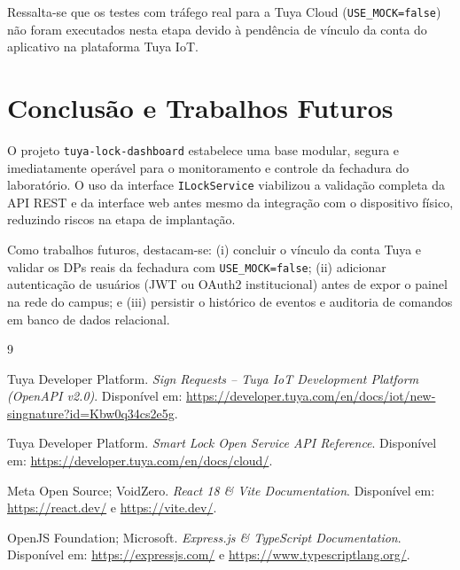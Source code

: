 \documentclass[10pt,twocolumn,a4paper]{article}
\begin{document}
Ressalta-se que os testes com tr\'afego real para a Tuya Cloud (\texttt{USE\_MOCK=false}) n\~ao foram executados nesta etapa devido \`a pend\^encia de v\'inculo da conta do aplicativo na plataforma Tuya IoT.

\section{Conclus\~ao e Trabalhos Futuros}

O projeto \texttt{tuya-lock-dashboard} estabelece uma base modular, segura e imediatamente oper\'avel para o monitoramento e controle da fechadura do laborat\'orio. O uso da interface \texttt{ILockService} viabilizou a valida\c{c}\~ao completa da API REST e da interface web antes mesmo da integra\c{c}\~ao com o dispositivo f\'isico, reduzindo riscos na etapa de implanta\c{c}\~ao.

Como trabalhos futuros, destacam-se: (i) concluir o v\'inculo da conta Tuya e validar os DPs reais da fechadura com \texttt{USE\_MOCK=false}; (ii) adicionar autentica\c{c}\~ao de usu\'arios (JWT ou OAuth2 institucional) antes de expor o painel na rede do campus; e (iii) persistir o hist\'orico de eventos e auditoria de comandos em banco de dados relacional.

\begin{thebibliography}{9}

Tuya Developer Platform. \textit{Sign Requests -- Tuya IoT Development Platform (OpenAPI v2.0)}. Dispon\'ivel em: \url{https://developer.tuya.com/en/docs/iot/new-singnature?id=Kbw0q34cs2e5g}.

Tuya Developer Platform. \textit{Smart Lock Open Service API Reference}. Dispon\'ivel em: \url{https://developer.tuya.com/en/docs/cloud/}.

Meta Open Source; VoidZero. \textit{React 18 \& Vite Documentation}. Dispon\'ivel em: \url{https://react.dev/} e \url{https://vite.dev/}.

OpenJS Foundation; Microsoft. \textit{Express.js \& TypeScript Documentation}. Dispon\'ivel em: \url{https://expressjs.com/} e \url{https://www.typescriptlang.org/}.

\end{thebibliography}
\end{document}

